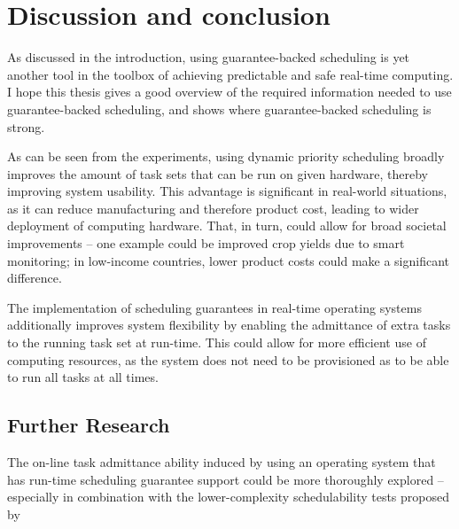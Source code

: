 \documentclass[twoside]{uva-inf-bachelor-thesis}
\begin{document}
\chapter{Discussion and conclusion}
As discussed in the introduction, using guarantee-backed scheduling is yet another tool in the toolbox of achieving predictable and safe real-time computing. I hope this thesis gives a good overview of the required information needed to use guarantee-backed scheduling, and shows where guarantee-backed scheduling is strong.

As can be seen from the experiments, using dynamic priority scheduling broadly improves the amount of task sets that can be run on given hardware, thereby improving system usability. This advantage is significant in real-world situations, as it can reduce manufacturing and therefore product cost, leading to wider deployment of computing hardware. That, in turn, could allow for broad societal improvements -- one example could be improved crop yields due to smart monitoring; in low-income countries, lower product costs could make a significant difference.

The implementation of scheduling guarantees in real-time operating systems additionally improves system flexibility by enabling the admittance of extra tasks to the running task set at run-time. This could allow for more efficient use of computing resources, as the system does not need to be provisioned as to be able to run all tasks at all times.

\section{Further Research}
The on-line task admittance ability induced by using an operating system that has run-time scheduling guarantee support could be more thoroughly explored -- especially in combination with the lower-complexity schedulability tests proposed by \textcite{Albers}

{
    \hfuzz=8pt
    \printbibliography
}
\end{document}
